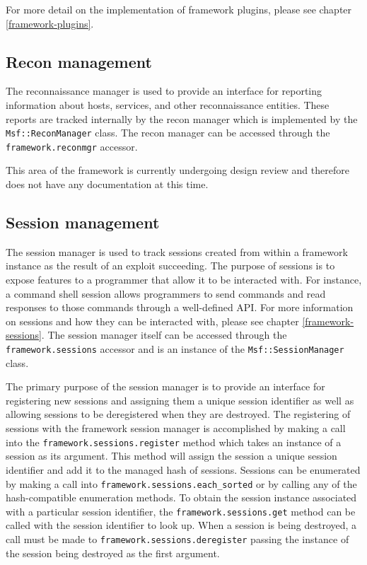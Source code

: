 \documentclass{report}
\begin{document}
\par
For more detail on the implementation of framework plugins, please
see chapter \ref{framework-plugins}.

        \subsection{Recon management}

\par
The reconnaissance manager is used to provide an interface for
reporting information about hosts, services, and other
reconnaissance entities.  These reports are tracked internally by
the recon manager which is implemented by the
\texttt{Msf::ReconManager} class.  The recon manager can be accessed
through the \texttt{framework.reconmgr} accessor.

\par
This area of the framework is currently undergoing design review and
therefore does not have any documentation at this time.

        \subsection{Session management}

\par
The session manager is used to track sessions created from within a
framework instance as the result of an exploit succeeding.  The
purpose of sessions is to expose features to a programmer that allow
it to be interacted with.  For instance, a command shell session
allows programmers to send commands and read responses to those
commands through a well-defined API.  For more information on
sessions and how they can be interacted with, please see chapter
\ref{framework-sessions}.  The session manager itself can be
accessed through the \texttt{framework.sessions} accessor and is an
instance of the \texttt{Msf::SessionManager} class.

\par
The primary purpose of the session manager is to provide an
interface for registering new sessions and assigning them a unique
session identifier as well as allowing sessions to be deregistered
when they are destroyed.  The registering of sessions with the
framework session manager is accomplished by making a call into the
\texttt{framework.sessions.register} method which takes an instance
of a session as its argument.  This method will assign the session a
unique session identifier and add it to the managed hash of
sessions.  Sessions can be enumerated by making a call into
\texttt{framework.sessions.each\_sorted} or by calling any of the
hash-compatible enumeration methods.  To obtain the session instance
associated with a particular session identifier, the
\texttt{framework.sessions.get} method can be called with the
session identifier to look up.  When a session is being destroyed, a
call must be made to \texttt{framework.sessions.deregister} passing
the instance of the session being destroyed as the first argument.
\end{document}

